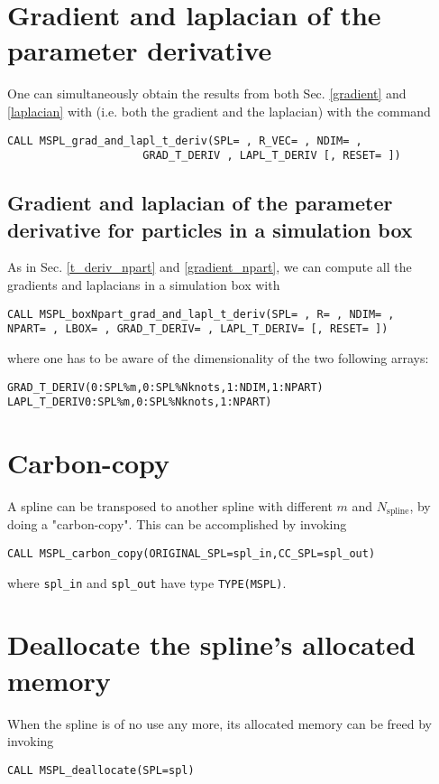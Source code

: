 \documentclass[11pt,a4paper,twoside]{article}
\begin{document}
\section{Gradient and laplacian of the parameter derivative}
One can simultaneously obtain the results from both Sec. \ref{gradient} and \ref{laplacian} with (i.e. both the gradient and the laplacian) with the command
\begin{verbatim}
CALL MSPL_grad_and_lapl_t_deriv(SPL= , R_VEC= , NDIM= , 
                     GRAD_T_DERIV , LAPL_T_DERIV [, RESET= ])
\end{verbatim}

\subsection{Gradient and laplacian of the parameter derivative for particles in a simulation box}
As in Sec. \ref{t_deriv_npart} and \ref{gradient_npart}, we can compute all the gradients and laplacians in a simulation box with
\begin{verbatim}
CALL MSPL_boxNpart_grad_and_lapl_t_deriv(SPL= , R= , NDIM= , 
NPART= , LBOX= , GRAD_T_DERIV= , LAPL_T_DERIV= [, RESET= ])
\end{verbatim}
where one has to be aware of the dimensionality of the two following arrays:
\begin{verbatim}
GRAD_T_DERIV(0:SPL%m,0:SPL%Nknots,1:NDIM,1:NPART)
LAPL_T_DERIV0:SPL%m,0:SPL%Nknots,1:NPART)
\end{verbatim}

\section{Carbon-copy}
A spline can be transposed to another spline with different $m$ and $N_{\text{spline}}$, by doing a "carbon-copy".
This can be accomplished by invoking
\begin{verbatim}
CALL MSPL_carbon_copy(ORIGINAL_SPL=spl_in,CC_SPL=spl_out)
\end{verbatim}
where \verb+spl_in+ and \verb+spl_out+ have type \verb+TYPE(MSPL)+.

\section{Deallocate the spline's allocated memory}
When the spline is of no use any more, its allocated memory can be freed by invoking
\begin{verbatim}
CALL MSPL_deallocate(SPL=spl)
\end{verbatim}
\end{document}
